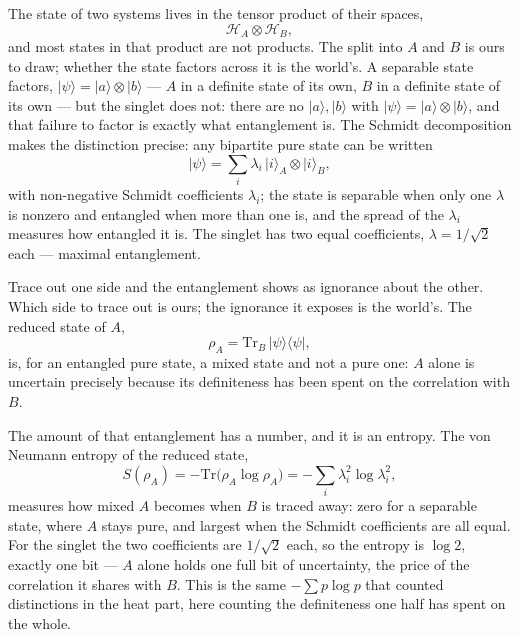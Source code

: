The state of two systems lives in the tensor product of their spaces,
\begin{equation}
  \mathcal{H}_A \otimes \mathcal{H}_B,
\end{equation}
and most states in that product are not products. The split into $A$ and $B$ is ours to draw; whether the
state factors across it is the world's. A separable state factors, $\lvert\psi\rangle = \lvert
a\rangle \otimes \lvert b\rangle$ --- $A$ in a definite state of its own, $B$ in a definite state of its own
--- but the singlet does not: there are no $\lvert a\rangle, \lvert b\rangle$ with $\lvert\psi\rangle = \lvert
a\rangle \otimes \lvert b\rangle$, and that failure to factor is exactly what entanglement is. The Schmidt
decomposition makes the distinction precise: any bipartite pure state can be written
\begin{equation}
  \lvert\psi\rangle = \sum_i \lambda_i\, \lvert i\rangle_A \otimes \lvert i\rangle_B,
\end{equation}
with non-negative Schmidt coefficients $\lambda_i$; the state is separable when only one $\lambda$ is nonzero
and entangled when more than one is, and the spread of the $\lambda_i$ measures how entangled it is. The
singlet has two equal coefficients, $\lambda = 1/\sqrt2$ each --- maximal entanglement.

Trace out one side and the entanglement shows as ignorance about the other. Which side to trace out is
ours; the ignorance it exposes is the world's. The reduced state of $A$,
\begin{equation}
  \rho_A = \mathrm{Tr}_B\,\lvert\psi\rangle\langle\psi\rvert,
\end{equation}
is, for an entangled pure state, a mixed state and not a pure one: $A$ alone is uncertain precisely because
its definiteness has been spent on the correlation with $B$.

The amount of that entanglement has a number, and it is an entropy. The von Neumann entropy of the reduced
state,
\begin{equation}
  S(\rho_A) = -\mathrm{Tr}\bigl(\rho_A \log \rho_A\bigr) = -\sum_i \lambda_i^2 \log \lambda_i^2,
\end{equation}
measures how mixed $A$ becomes when $B$ is traced away: zero for a separable state, where $A$ stays pure, and
largest when the Schmidt coefficients are all equal. For the singlet the two coefficients are $1/\sqrt2$ each,
so the entropy is $\log 2$, exactly one bit --- $A$ alone holds one full bit of uncertainty, the price of the
correlation it shares with $B$. This is the same $-\sum p \log p$ that counted distinctions in the heat part,
here counting the definiteness one half has spent on the whole.

